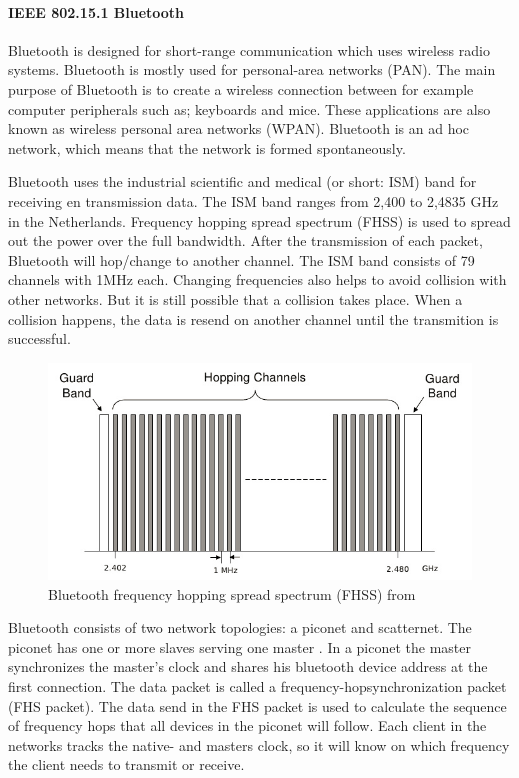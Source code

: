 \documentclass[10pt,a4paper]{article}
\begin{document}
\paragraph{IEEE 802.15.1 Bluetooth}
Bluetooth is designed for short-range communication which uses wireless radio systems. Bluetooth is mostly used for personal-area networks (PAN). \cite{combook} The main purpose of Bluetooth is to create a wireless connection between for example computer peripherals such as; keyboards and mice. These applications are also known as wireless personal area networks (WPAN). \cite{comparitivestudywirelessprotocols} Bluetooth is an ad hoc network, which means that the network is formed spontaneously.\cite{tcipbook}

Bluetooth uses the industrial scientific and medical (or short: ISM) band for receiving en transmission data. The ISM band ranges from 2,400 to 2,4835 GHz in the Netherlands. \cite{frequencyandsnetherlands} Frequency hopping spread spectrum (FHSS) is used to spread out the power over the full bandwidth. After the transmission of each packet, Bluetooth will hop/change to another channel. The ISM band consists of 79 channels with 1MHz each. Changing frequencies also helps to avoid collision with other networks. But it is still possible that a collision takes place. When a collision happens, the data is resend on another channel until the transmition is successful.

\begin{figure}[H]
   \centering
   \includegraphics[width=1\textwidth]{bluetoothfh}
   \caption{Bluetooth frequency hopping spread spectrum (FHSS) from \cite{bluetoothspectrum}}
   \label{fig:bluetoothfh}
\end{figure}

Bluetooth consists of two network topologies: a piconet and scatternet. The piconet has one or more slaves serving one master \cite{bluetoothpiconet}. In a piconet the master synchronizes the master's clock and shares his bluetooth device address at the first connection. The data packet is called a frequency-hopsynchronization packet (FHS packet). The data send in the FHS packet is used to calculate the sequence of frequency hops that all devices in the piconet will follow. Each client in the networks tracks the native- and masters clock, so it will know on which frequency the client needs to transmit or receive.
\end{document}
